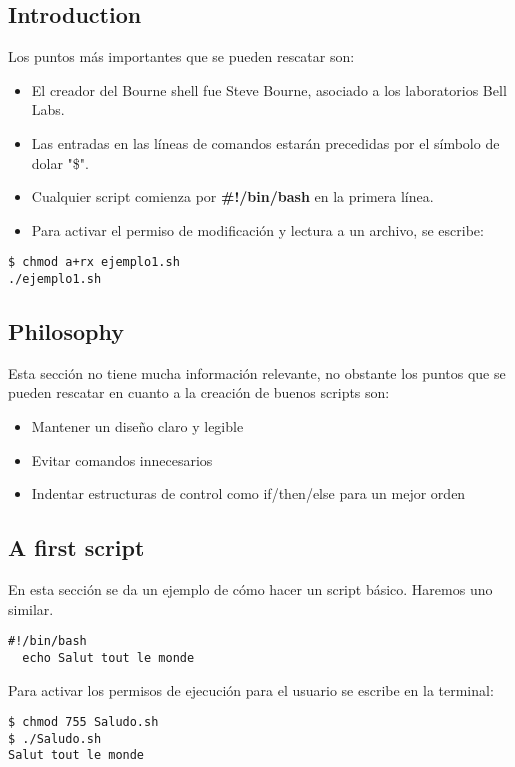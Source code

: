 \documentclass[a4paper]{article}
\begin{document}
\subsection{Introduction}

Los puntos más importantes que se pueden rescatar son:

\begin{itemize}

\item El creador del Bourne shell fue Steve Bourne, asociado a los laboratorios Bell Labs. 
\item Las entradas en las líneas de comandos estarán precedidas por el símbolo de dolar "\$". 
\item Cualquier script comienza por \textbf{ \#!/bin/bash } en la primera línea.
\item Para activar el permiso de modificación y lectura a un archivo, se escribe:
\end{itemize}
\begin{verbatim}
$ chmod a+rx ejemplo1.sh
./ejemplo1.sh
\end{verbatim}

\subsection{Philosophy}
Esta sección no tiene mucha información relevante, no obstante los puntos que se pueden rescatar en cuanto a la creación de buenos scripts son:
\begin{itemize}
\item Mantener un diseño claro y legible
\item Evitar comandos innecesarios
\item Indentar estructuras de control como if/then/else para un mejor orden
\end{itemize}


\subsection{A first script}

En esta sección se da un ejemplo de cómo hacer un script básico. Haremos uno similar.

\begin{verbatim}
#!/bin/bash
  echo Salut tout le monde
\end{verbatim}

Para activar los permisos de ejecución para el usuario se escribe en la terminal:

\begin{verbatim}
$ chmod 755 Saludo.sh
$ ./Saludo.sh
Salut tout le monde 

\end{verbatim}
\end{document}
